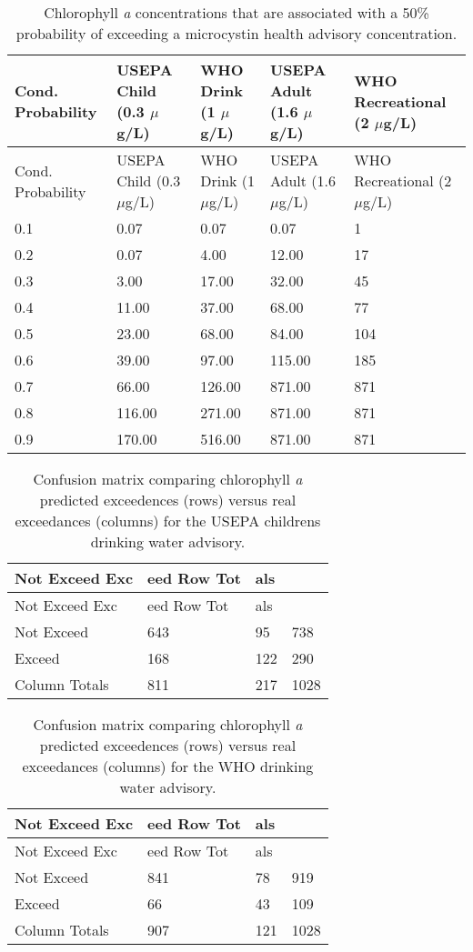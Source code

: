 \documentclass[11pt,]{article}
\begin{document}
\begin{longtable}[c]{@{}lllll@{}}
\caption{Chlorophyll \textit{a} concentrations that are associated with
a 50\% probability of exceeding a microcystin health advisory
concentration. \label{tab:mc_chla_table}}\tabularnewline
\toprule
Cond. Probability & USEPA Child (0.3 \(\mu\)g/L) & WHO Drink (1
\(\mu\)g/L) & USEPA Adult (1.6 \(\mu\)g/L) & WHO Recreational (2
\(\mu\)g/L)\tabularnewline
\midrule
\endfirsthead
\toprule
Cond. Probability & USEPA Child (0.3 \(\mu\)g/L) & WHO Drink (1
\(\mu\)g/L) & USEPA Adult (1.6 \(\mu\)g/L) & WHO Recreational (2
\(\mu\)g/L)\tabularnewline
\midrule
\endhead
0.1 & 0.07 & 0.07 & 0.07 & 1\tabularnewline
0.2 & 0.07 & 4.00 & 12.00 & 17\tabularnewline
0.3 & 3.00 & 17.00 & 32.00 & 45\tabularnewline
0.4 & 11.00 & 37.00 & 68.00 & 77\tabularnewline
0.5 & 23.00 & 68.00 & 84.00 & 104\tabularnewline
0.6 & 39.00 & 97.00 & 115.00 & 185\tabularnewline
0.7 & 66.00 & 126.00 & 871.00 & 871\tabularnewline
0.8 & 116.00 & 271.00 & 871.00 & 871\tabularnewline
0.9 & 170.00 & 516.00 & 871.00 & 871\tabularnewline
\bottomrule
\end{longtable}

\newpage

\begin{longtable}[c]{@{}llll@{}}
\caption{Confusion matrix comparing chlorophyll \textit{a} predicted
exceedences (rows) versus real exceedances (columns) for the USEPA
childrens drinking water advisory.
\label{tab:child_conmat_table}}\tabularnewline
\toprule
Not Exceed Exc & eed Row Tot & als &\tabularnewline
\midrule
\endfirsthead
\toprule
Not Exceed Exc & eed Row Tot & als &\tabularnewline
\midrule
\endhead
Not Exceed & 643 & 95 & 738\tabularnewline
Exceed & 168 & 122 & 290\tabularnewline
Column Totals & 811 & 217 & 1028\tabularnewline
\bottomrule
\end{longtable}

\newpage

\begin{longtable}[c]{@{}llll@{}}
\caption{Confusion matrix comparing chlorophyll \textit{a} predicted
exceedences (rows) versus real exceedances (columns) for the WHO
drinking water advisory.
\label{tab:who_drink_conmat_table}}\tabularnewline
\toprule
Not Exceed Exc & eed Row Tot & als &\tabularnewline
\midrule
\endfirsthead
\toprule
Not Exceed Exc & eed Row Tot & als &\tabularnewline
\midrule
\endhead
Not Exceed & 841 & 78 & 919\tabularnewline
Exceed & 66 & 43 & 109\tabularnewline
Column Totals & 907 & 121 & 1028\tabularnewline
\bottomrule
\end{longtable}
\end{document}

